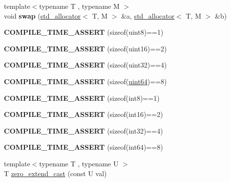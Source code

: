 \begin{DoxyCompactItemize}
\item 
\hypertarget{namespacedlib_acf38fa94722837a9a6c027cdedb3d95c}{
{\footnotesize template$<$typename T , typename M $>$ }\\void {\bfseries swap} (\hyperlink{classdlib_1_1std__allocator}{std\_\-allocator}$<$ T, M $>$ \&a, \hyperlink{classdlib_1_1std__allocator}{std\_\-allocator}$<$ T, M $>$ \&b)}
\label{namespacedlib_acf38fa94722837a9a6c027cdedb3d95c}

\item 
\hypertarget{namespacedlib_aeb7adb34b3185802d0bb88a1cdc74e0a}{
{\bfseries COMPILE\_\-TIME\_\-ASSERT} (sizeof(uint8)==1)}
\label{namespacedlib_aeb7adb34b3185802d0bb88a1cdc74e0a}

\item 
\hypertarget{namespacedlib_a35a780750c26bf4dbdf1c35fe1a56c3e}{
{\bfseries COMPILE\_\-TIME\_\-ASSERT} (sizeof(uint16)==2)}
\label{namespacedlib_a35a780750c26bf4dbdf1c35fe1a56c3e}

\item 
\hypertarget{namespacedlib_acedb24147b035ef793368d07f6e442a9}{
{\bfseries COMPILE\_\-TIME\_\-ASSERT} (sizeof(uint32)==4)}
\label{namespacedlib_acedb24147b035ef793368d07f6e442a9}

\item 
\hypertarget{namespacedlib_acfbff5c3e08b2c288cb019376894949a}{
{\bfseries COMPILE\_\-TIME\_\-ASSERT} (sizeof(\hyperlink{namespacedlib_a61113f8b6b3e4ccb66deca9355c8f65d}{uint64})==8)}
\label{namespacedlib_acfbff5c3e08b2c288cb019376894949a}

\item 
\hypertarget{namespacedlib_aec561058332d9a7ccc288ff03c0a3452}{
{\bfseries COMPILE\_\-TIME\_\-ASSERT} (sizeof(int8)==1)}
\label{namespacedlib_aec561058332d9a7ccc288ff03c0a3452}

\item 
\hypertarget{namespacedlib_abf49734f8889a0230d2167d84acc3987}{
{\bfseries COMPILE\_\-TIME\_\-ASSERT} (sizeof(int16)==2)}
\label{namespacedlib_abf49734f8889a0230d2167d84acc3987}

\item 
\hypertarget{namespacedlib_a35f54002263fc38d786ef9c76668f950}{
{\bfseries COMPILE\_\-TIME\_\-ASSERT} (sizeof(int32)==4)}
\label{namespacedlib_a35f54002263fc38d786ef9c76668f950}

\item 
\hypertarget{namespacedlib_a66818c36792273096fbf0e1168764bd1}{
{\bfseries COMPILE\_\-TIME\_\-ASSERT} (sizeof(int64)==8)}
\label{namespacedlib_a66818c36792273096fbf0e1168764bd1}

\item 
{\footnotesize template$<$typename T , typename U $>$ }\\T \hyperlink{namespacedlib_a87847cba5edee8c23c0970bbe19fa3ce}{zero\_\-extend\_\-cast} (const U val)
\end{DoxyCompactItemize}
